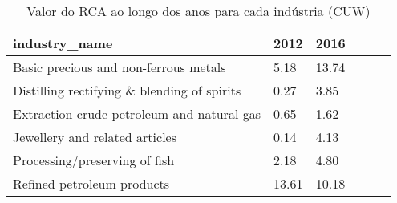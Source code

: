 \begin{table}
\centering
\caption{Valor do RCA ao longo dos anos para cada indústria (CUW)}
\begin{tabular}{p{6cm}p{1.5cm}p{1.5cm}p{1.5cm}p{1.5cm}p{1.5cm}}
\toprule
                              industry\_name &  2012 &  2016 \\
\midrule
      Basic precious and non-ferrous metals &  5.18 & 13.74 \\
Distilling rectifying \& blending of spirits &  0.27 &  3.85 \\
 Extraction crude petroleum and natural gas &  0.65 &  1.62 \\
             Jewellery and related articles &  0.14 &  4.13 \\
              Processing/preserving of fish &  2.18 &  4.80 \\
                 Refined petroleum products & 13.61 & 10.18 \\
\bottomrule
\end{tabular}
\end{table}
